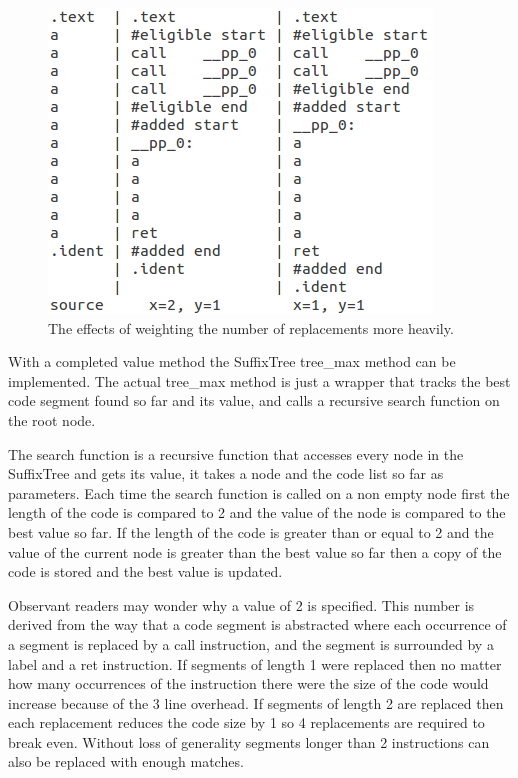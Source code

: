 \documentclass[9pt,nocopyrightspace]{sigplanconf}
\begin{document}
\begin{figure}
\begin{center}
\includegraphics[scale=.8]{weightex}
\caption{The effects of weighting the number of replacements more heavily.}
\end{center}
\end{figure}

With a completed value method the SuffixTree tree\_max method can be implemented.
The actual tree\_max method is just a wrapper that tracks the best code segment found so far and its value, and calls a recursive search function on the root node.

The search function is a recursive function that accesses every node in the SuffixTree and gets its value, it takes a node and the code list so far as parameters.
Each time the search function is called on a non empty node first the length of the code is compared to 2 and the value of the node is compared to the best value so far.
If the length of the code is greater than or equal to 2 and the value of the current node is greater than the best value so far then a copy of the code is stored and the best value is updated.

Observant readers may wonder why a value of 2 is specified.
This number is derived from the way that a code segment is abstracted where each occurrence of a segment is replaced by a call instruction, and the segment is surrounded by a label and a ret instruction.
If segments of length 1 were replaced then no matter how many occurrences of the instruction there were the size of the code would increase because of the 3 line overhead.
If segments of length 2 are replaced then each replacement reduces the code size by 1 so 4 replacements are required to break even.
Without loss of generality segments longer than 2 instructions can also be replaced with enough matches.
\end{document}
